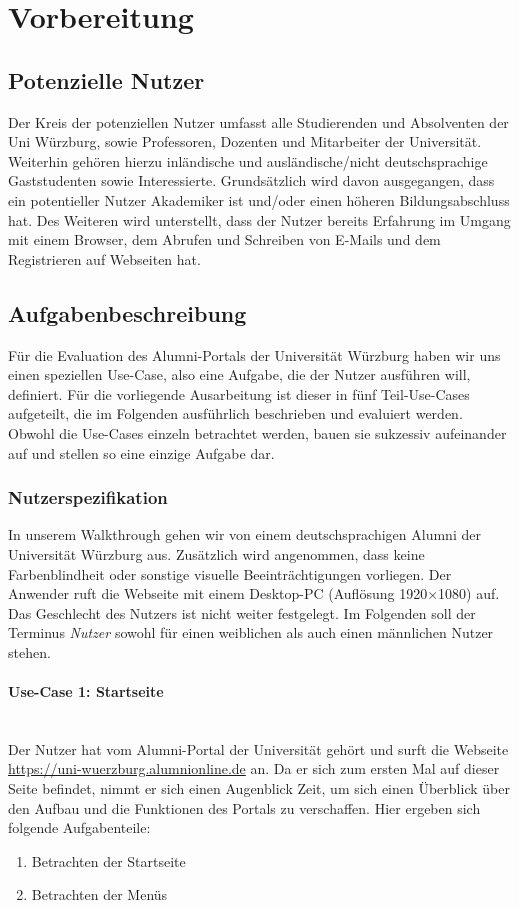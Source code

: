 \section{Vorbereitung}
\subsection{Potenzielle Nutzer}
Der Kreis der potenziellen Nutzer umfasst alle Studierenden und Absolventen der Uni Würzburg, sowie Professoren, Dozenten und Mitarbeiter der Universität. Weiterhin gehören hierzu inländische und ausländische/nicht deutschsprachige Gaststudenten sowie Interessierte. Grundsätzlich wird davon ausgegangen, dass ein potentieller Nutzer Akademiker ist und/oder einen höheren Bildungsabschluss hat. Des Weiteren wird unterstellt, dass der Nutzer bereits Erfahrung im Umgang mit einem Browser, dem Abrufen und Schreiben von E-Mails und dem Registrieren auf Webseiten hat. 

\subsection{Aufgabenbeschreibung}
Für die Evaluation des Alumni-Portals der Universität Würzburg haben wir uns einen speziellen Use-Case, also eine Aufgabe, die der Nutzer ausführen will, definiert. 
Für die vorliegende Ausarbeitung ist dieser in fünf Teil-Use-Cases aufgeteilt, die im Folgenden ausführlich beschrieben und evaluiert werden. Obwohl die Use-Cases einzeln betrachtet werden, bauen sie sukzessiv aufeinander auf und stellen so eine einzige Aufgabe dar.

\subsubsection*{Nutzerspezifikation}
In unserem Walkthrough gehen wir von einem deutschsprachigen Alumni der Universität Würzburg aus. Zusätzlich wird angenommen, dass keine Farbenblindheit oder sonstige visuelle Beeinträchtigungen vorliegen. 
Der Anwender ruft die Webseite mit einem Desktop-PC (Auflösung 1920$\times$1080) auf. 
Das Geschlecht des Nutzers ist nicht weiter festgelegt. Im Folgenden soll der Terminus \emph{Nutzer} sowohl für einen weiblichen als auch einen männlichen Nutzer stehen.

\paragraph{Use-Case 1: Startseite}\quad\\
Der Nutzer hat vom Alumni-Portal der Universität gehört und surft die Webseite \url{https://uni-wuerzburg.alumnionline.de} an. Da er sich zum ersten Mal auf dieser Seite befindet, nimmt er sich einen Augenblick Zeit, um sich einen Überblick über den Aufbau und die Funktionen des Portals zu verschaffen.
Hier ergeben sich folgende Aufgabenteile:
\begin{enumerate}

		\item Betrachten der Startseite
		\item Betrachten der Menüs
\end{enumerate}

